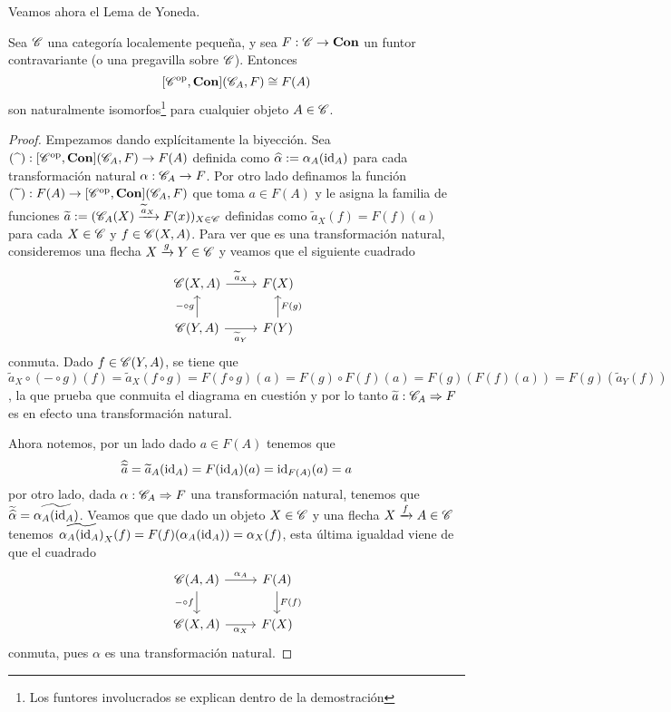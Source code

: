 \documentclass{comunicaciones}
\begin{document}
Veamos ahora el Lema de Yoneda.

\begin{lem}[Yoneda]
    Sea $\mathscr C$ una categoría localemente pequeña, y sea $F:\mathscr C\to\mathbf{Con}$ un funtor contravariante (o una pregavilla sobre $\mathscr C$). Entonces
    \[ [\mathscr C^{\mathrm{op}},\mathbf{Con}](\mathscr C_A,F)\cong F(A) \]
    son naturalmente isomorfos\footnote{Los funtores involucrados se explican dentro de la demostración} para cualquier objeto $A\in\mathscr C$.
\end{lem}

\begin{proof}
    Empezamos dando explícitamente la biyección. Sea $(\widehat{\phantom{a}}):[\mathscr C^{\mathrm{op}},\mathbf{Con}](\mathscr C_A,F)\to F(A)$ definida como $\widehat{\alpha}:=\alpha_A(\mathrm{id}_A)$ para cada
    transformación natural $\alpha:\mathscr C_A\to F$. Por otro lado definamos la función $(\widetilde{\phantom{a}}):F(A)\to[\mathscr C^{\mathrm{op}},\mathbf{Con}](\mathscr C_A,F)$ que toma $a\in F(A)$ y 
    le asigna la familia de funciones $\widetilde{a}:=(\mathscr C_A(X)\xrightarrow{\widetilde{a}_X}F(x))_{X\in\mathscr C}$ definidas como $\widetilde{a}_X(f)=F(f)(a)$ para cada
    $X\in\mathscr C$ y $f\in\mathscr C(X,A)$. Para ver que es una transformación natural, consideremos una flecha $X\xrightarrow{g}Y\in\mathscr C$ y veamos que el siguiente cuadrado
    \[\begin{tikzcd}
        {\C(X,A)} & {F(X)} \\
        {\C(Y,A)} & {F(Y)}
        \arrow["{\widetilde{a}_X}", from=1-1, to=1-2]
        \arrow["{-\circ g}", from=2-1, to=1-1]
        \arrow["{\widetilde{a}_Y}"', from=2-1, to=2-2]
        \arrow["{F(g)}"', from=2-2, to=1-2]
    \end{tikzcd}\]
    conmuta. Dado $f\in\mathscr C(Y,A)$, se tiene que $\widetilde{a}_X\circ(- \circ g)(f)=\widetilde{a}_X(f\circ g)=F(f\circ g)(a)=F(g)\circ F(f)(a)=F(g)(F(f)(a))=
    F(g)(\widetilde{a}_Y(f))$, la que prueba que conmuita el diagrama en cuestión y por lo tanto $\widetilde{a}:\mathscr C_A\Rightarrow F$ es en efecto una transformación
    natural.
    
    Ahora notemos, por un lado dado $a\in F(A)$ tenemos que
    \[ \widehat{\widetilde{a}}=\widetilde{a}_A(\mathrm{id}_A)=F(\mathrm{id}_A)(a)=\mathrm{id}_{F(A)}(a)=a \]
    por otro lado, dada $\alpha:\mathscr C_A\Rightarrow F$ una transformación natural, tenemos que $\widetilde{\widehat{\alpha}}=\widetilde{\alpha_A(\mathrm{id}_A)}$. Veamos que
    que dado un objeto $X\in\mathscr C$ y una flecha $X\xrightarrow{f}A\in\mathscr C$ tenemos $\widetilde{\alpha_A(\mathrm{id}_A)}_X(f)=F(f)(\alpha_A(\mathrm{id}_A))=\alpha_X(f)$, esta última
    igualdad viene de que el cuadrado
    \[\begin{tikzcd}
        {\C(A,A)} & {F(A)} \\
        {\C(X,A)} & {F(X)}
        \arrow["{\alpha_A}", from=1-1, to=1-2]
        \arrow["{-\circ f}"', from=1-1, to=2-1]
        \arrow["{F(f)}", from=1-2, to=2-2]
        \arrow["{\alpha_X}"', from=2-1, to=2-2]
    \end{tikzcd}\]
    conmuta, pues $\alpha$ es una transformación natural.


\end{proof}
\end{document}
